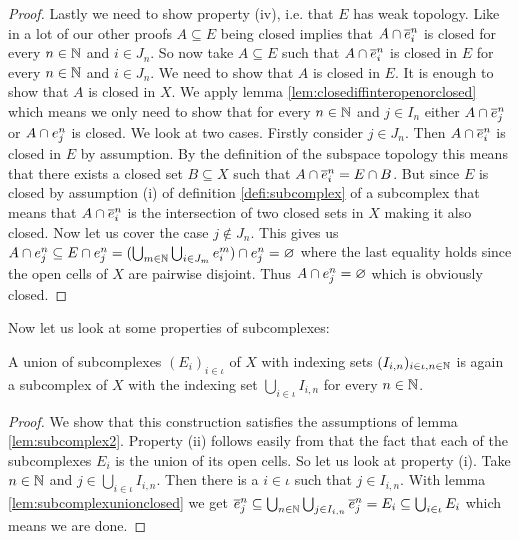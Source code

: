 \begin{proof}
    Lastly we need to show property (iv), i.e. that $E$ has weak topology. 
    Like in a lot of our other proofs $A \subseteq E$ being closed implies that $A \cap \closedCell{n}{i}$ is closed for every $n \in \bN$ and $i \in J_n$. 
    So now take $A \subseteq E$ such that $A \cap \closedCell{n}{i}$ is closed in $E$ for every $n \in \bN$ and $i \in J_n$. 
    We need to show that $A$ is closed in $E$.
    It is enough to show that $A$ is closed in $X$. 
    We apply lemma \ref{lem:closediffinteropenorclosed} which means we only need to show that for every $n \in \bN$ and $j \in I_n$ either $A \cap \closedCell{n}{j}$ or $A \cap \openCell{n}{j}$ is closed. 
    We look at two cases. 
    Firstly consider $j \in J_n$. 
    Then $A \cap \closedCell{n}{i}$ is closed in $E$ by assumption.
    By the definition of the subspace topology this means that there exists a closed set $B \subseteq X$ such that $A \cap \closedCell{n}{i} = E \cap B$. 
    But since $E$ is closed by assumption (i) of definition \ref{defi:subcomplex} of a subcomplex that means that $A \cap \closedCell{n}{i}$ is the intersection of two closed sets in $X$ making it also closed. 
    Now let us cover the case $j \notin J_n$. 
    This gives us $A \cap \openCell{n}{j} \subseteq E \cap \openCell{n}{j} = (\bigcup_{m \in \bN} \bigcup_{i \in J_m} \openCell{m}{i}) \cap \openCell{n}{j} = \varnothing$ where the last equality holds since the open cells of $X$ are pairwise disjoint. 
    Thus $A \cap \openCell{n}{j} = \varnothing$ which is obviously closed.
\end{proof}

Now let us look at some properties of subcomplexes: 

\begin{lem} \label{lem:unionsubcomplexes}
    A union of subcomplexes $(E_i)_{i \in \iota}$ of $X$  with indexing sets $(I_{i, n})_{i \in \iota, n \in \bN}$ is again a subcomplex of $X$ with the indexing set $\bigcup_{i \in \iota} I_{i, n}$ for every $n \in \bN$.
\end{lem}
\begin{proof}
    We show that this construction satisfies the assumptions of lemma \ref{lem:subcomplex2}. 
    Property (ii) follows easily from that the fact that each of the subcomplexes $E_i$ is the union of its open cells. 
    So let us look at property (i).
    Take $n \in \bN$ and $j \in \bigcup_{i \in \iota} I_{i, n}$. 
    Then there is a $i \in \iota$ such that $j \in I_{i, n}$. 
    With lemma \ref{lem:subcomplexunionclosed} we get 
    $\closedCell{n}{j} \subseteq \bigcup_{n \in \bN}\bigcup_{j \in I_{i, n}} \closedCell{n}{j} = E_i \subseteq \bigcup_{i \in \iota} E_i$ which means we are done.
\end{proof}

